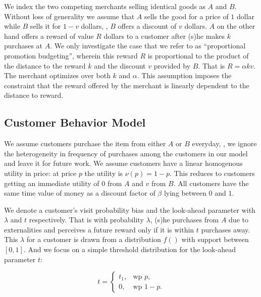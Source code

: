 We index the two competing merchants selling identical goods as $A$ and $B$.
Without loss of generality we assume that $A$ sells the good for a price of $1$ dollar while $B$ sells it for $1-v$ dollars, \ie, $B$ offers a discount of $v$ dollars. 
$A$ on the other hand offers a reward of value $R$ dollars to a customer after (s)he makes $k$ purchases at $A$. 
We only investigate the case that we refer to as ``proportional promotion budgeting'', wherein this reward $R$ is proportional to the product of the distance to the reward $k$ and the discount $v$ provided by $B$.
That is $R = \alpha k v$.
The merchant optimizes over both $k$ and $\alpha$.
This assumption imposes the constraint that the reward offered by the merchant is linearly dependent to the distance to reward.

\subsection{Customer Behavior Model}
We assume customers purchase the item from either $A$ or $B$ everyday, \ie, we ignore the heterogeneity in frequency of purchases among the customers in our model and leave it for future work.
We assume customers have a linear homogenous utility in price: at price $p$ the utility is $\nu(p) = 1-p$. 
This reduces to customers getting an immediate utility of $0$ from $A$ and $v$ from $B$.
All customers have the same time value of money as a discount factor of $\beta$ lying between $0$ and $1$.

We denote a customer's visit probability bias and the look-ahead parameter with $\lambda$ and $t$ respectively. 
That is with probability $\lambda$, (s)he purchases from $A$ due to externalities and perceives a future reward only if it is within $t$ purchases away. 
This $\lambda$ for a customer is drawn from a distribution $f()$ with support between $[0,1]$.
And we focus on a simple threshold distribution for the look-ahead parameter $t$: 

\begin{equation*}
  t=\begin{cases}
    t_1, & \text{wp } p,\\
    0, & \text{wp } 1-p.
  \end{cases}
\end{equation*}

